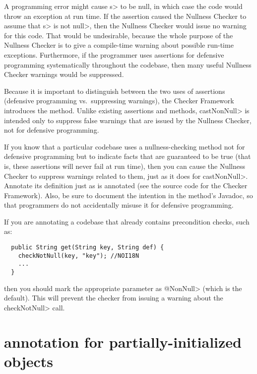 A programming error might cause \<s> to be null, in which case the code
would throw an exception at run time.
If the assertion caused the Nullness Checker to assume that \<s> is not
\<null>, then the Nullness Checker would issue no warning for this code.
That would be undesirable, because the whole purpose of the Nullness
Checker is to give a compile-time warning about possible run-time
exceptions.  Furthermore, if the programmer uses assertions for defensive
programming systematically throughout the codebase, then many useful
Nullness Checker warnings would be suppressed.


Because it is important to distinguish between the two uses of assertions
(defensive programming vs.~suppressing warnings), the Checker Framework
introduces the  method.
Unlike existing assertions and
methods, \<castNonNull> is intended only to suppress false warnings that are
issued by the Nullness Checker, not for defensive programming.

If you know that a particular codebase uses
a nullness-checking method not for defensive programming but to indicate
facts that are guaranteed to be true (that is, these assertions will never
fail at run time), then you can cause the Nullness Checker to suppress
warnings related to them, just as it does for \<castNonNull>.
Annotate its definition just as
 is annotated (see the
source code for the Checker Framework).
Also, be sure to document the intention in the method's Javadoc, so that
programmers do not
accidentally misuse it for defensive programming.


If you are annotating a codebase that already contains precondition checks,
such as:

\begin{Verbatim}
  public String get(String key, String def) {
    checkNotNull(key, "key"); //NOI18N
    ...
  }
\end{Verbatim}

\noindent
then you should mark the appropriate parameter as \<@NonNull> (which is the
default).  This will prevent the checker from issuing a warning about the
\<checkNotNull> call.


\section{ annotation for partially-initialized objects\label{raw-partially-initialized}}

